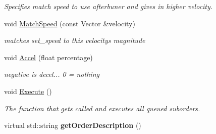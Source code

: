 \begin{DoxyCompactItemize}
\begin{DoxyCompactList}\small\item\em Specifies match speed to use afterbuner and gives in higher velocity. \end{DoxyCompactList}\item 
void \hyperlink{classFlyByWire_a70540d9a99dcebafa3515d54ebce76c3}{Match\+Speed} (const Vector \&velocity)\hypertarget{classFlyByWire_a70540d9a99dcebafa3515d54ebce76c3}{}\label{classFlyByWire_a70540d9a99dcebafa3515d54ebce76c3}

\begin{DoxyCompactList}\small\item\em matches set\+\_\+speed to this velocity\textquotesingle{}s magnitude \end{DoxyCompactList}\item 
void \hyperlink{classFlyByWire_a355b7129a48a80633858e1b22a36d5b8}{Accel} (float percentage)\hypertarget{classFlyByWire_a355b7129a48a80633858e1b22a36d5b8}{}\label{classFlyByWire_a355b7129a48a80633858e1b22a36d5b8}

\begin{DoxyCompactList}\small\item\em negative is decel... 0 = nothing \end{DoxyCompactList}\item 
void \hyperlink{classFlyByWire_aad45982f30b6a60845992fde8d4e0751}{Execute} ()\hypertarget{classFlyByWire_aad45982f30b6a60845992fde8d4e0751}{}\label{classFlyByWire_aad45982f30b6a60845992fde8d4e0751}

\begin{DoxyCompactList}\small\item\em The function that gets called and executes all queued suborders. \end{DoxyCompactList}\item 
virtual std\+::string {\bfseries get\+Order\+Description} ()\hypertarget{classFlyByWire_a79dc98cd05ef198e40b45308fdd871fd}{}\label{classFlyByWire_a79dc98cd05ef198e40b45308fdd871fd}

\end{DoxyCompactItemize}
